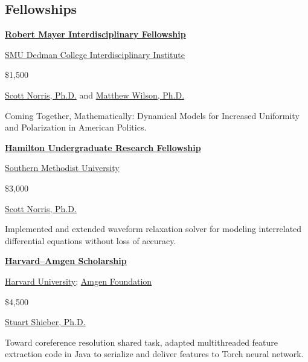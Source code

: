 \documentclass[margin, 10pt]{res} %
\newcommand{\SMU}{\href{https://www.smu.edu/}{Southern Methodist University}}
\begin{document}
\begin{resume}

\section{Fellowships}

\textbf{\href{http://www.smu.edu/Dedman/DCII/Programs/Mayer}{Robert Mayer Interdisciplinary Fellowship}}
\begin{description}[nosep, labelindent=1em]
\item[Awarding body:] \href{http://www.smu.edu/Dedman/DCII}{SMU Dedman College Interdisciplinary Institute}
\item[Amount:] \$1,500
\item[Supervisor:] \href{http://faculty.smu.edu/snorris/}{Scott Norris, Ph.D.} and \href{https://www.smu.edu/News/Experts/Matthew-Wilson}{Matthew Wilson, Ph.D.}
\item Coming Together, Mathematically: Dynamical Models for Increased Uniformity and Polarization in American Politics.
\end{description}

\begin{samepage}
\textbf{\href{http://www.smu.edu/Dedman/DCII/Programs/Hamilton}{Hamilton Undergraduate Research Fellowship}}
\begin{description}[nosep, labelindent=1em]
\item[Awarding body:] \SMU
\item[Amount:] \$3,000
\item[Supervisor:] \href{http://faculty.smu.edu/snorris/}{Scott Norris, Ph.D.}
\item Implemented and extended waveform relaxation solver for modeling interrelated differential equations without loss of accuracy.
\end{description}
\end{samepage}


\textbf{\href{https://uraf.harvard.edu/amgen-scholars}{Harvard--Amgen Scholarship}}
\begin{description}[nosep, labelindent=1em]
\item[Awarding body:] \href{https://uraf.harvard.edu/home}{Harvard University}; \href{http://www.amgen.com/responsibility/amgen-foundation/}{Amgen Foundation}
\item[Amount:] \$4,500
\item[Supervisor:] \href{http://www.eecs.harvard.edu/shieber/}{Stuart Shieber, Ph.D.}
\item Toward coreference resolution shared task, adapted multithreaded feature extraction code in Java to serialize and deliver features to Torch neural network.
\end{description}


\end{resume}
\end{document}
